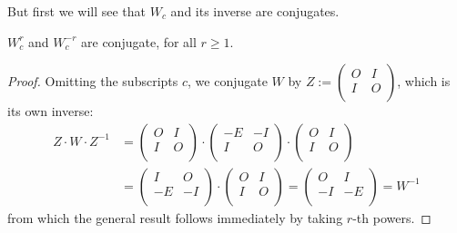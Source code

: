 But first we will see that $W_{c}$ and its inverse are conjugates.
\begin{lemma}
  $W_{c}^r$ and $W_{c}^{-r}$ are conjugate, for all $r\geq 1$.
\end{lemma}

\begin{proof}
  Omitting the subscripts $c$, we conjugate $W$ by
  $Z := \left(\begin{smallmatrix} O & I \\ I & O \\\end{smallmatrix}\right)$,
  which is its own inverse:
  \[
  \begin{aligned}
  Z \cdot W \cdot Z^{-1}
  & =
  \left(
  \begin{array}{cc}
    O & I \\
    I & O \\
  \end{array}
  \right)
  \cdot
  \left(
  \begin{array}{cc}
    -E & -I \\
     I &  O \\
  \end{array}
  \right)
  \cdot
  \left(
  \begin{array}{cc}
    O & I \\
    I & O \\
  \end{array}
  \right)\\
  & =
  \left(
  \begin{array}{cc}
     I &  O \\
    -E & -I \\
  \end{array}
  \right)
  \cdot
  \left(
  \begin{array}{cc}
    O & I \\
    I & O \\
  \end{array}
  \right) 
   =
  \left(
  \begin{array}{cc}
     O &  I \\
    -I & -E \\
  \end{array}
  \right) 
   =
  W^{-1}
  \end{aligned}
  \]
from which the general result follows immediately by taking $r$-th powers.
\end{proof}

